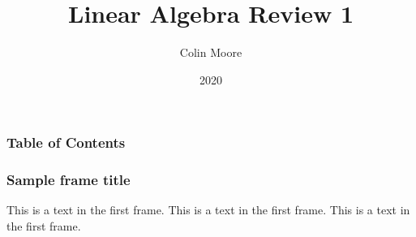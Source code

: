 \documentclass{beamer}
\title{Linear Algebra Review 1}
\author{Colin Moore}
\institute{Overleaf}
\date{2020}
\begin{document}
\frame{\titlepage}

\begin{frame}
	\frametitle{Table of Contents}
	\tableofcontents
\end{frame}

\begin{frame}
\frametitle{Sample frame title}
This is a text in the first frame. This is a text in the first frame. This is a text in the first frame.
\end{frame}
\end{document}
